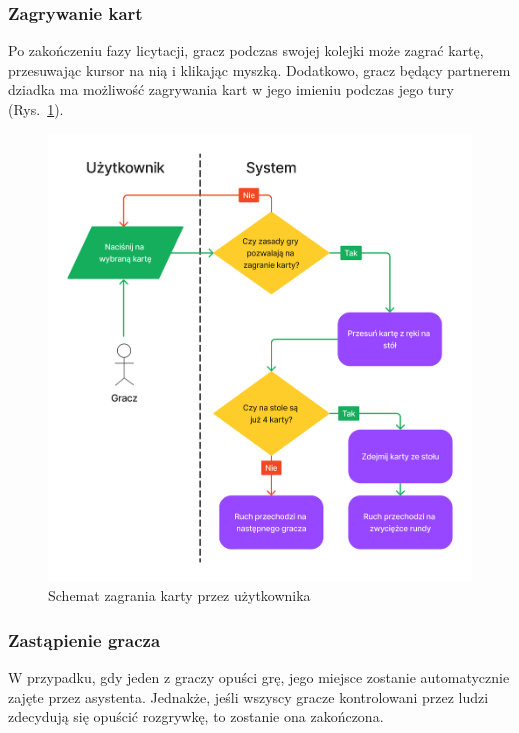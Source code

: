 \FloatBarrier

\subsubsection{Zagrywanie kart}

Po zakończeniu fazy licytacji, gracz podczas swojej kolejki może zagrać kartę,
przesuwając kursor na nią i klikając myszką. Dodatkowo, gracz będący partnerem dziadka
ma możliwość zagrywania kart w jego imieniu podczas jego tury (Rys.~\ref{fig:schemat_play_card}).


\begin{figure}[h]
  \centering
  \includegraphics[width=\textwidth]{img/schematy/play_card.png}
  \caption{Schemat zagrania karty przez użytkownika}
  \label{fig:schemat_play_card}
\end{figure}

\FloatBarrier

\subsubsection{Zastąpienie gracza}
W przypadku, gdy jeden z graczy opuści grę, jego miejsce zostanie automatycznie
zajęte przez asystenta. Jednakże, jeśli wszyscy gracze kontrolowani przez ludzi
zdecydują się opuścić rozgrywkę, to zostanie ona zakończona.

